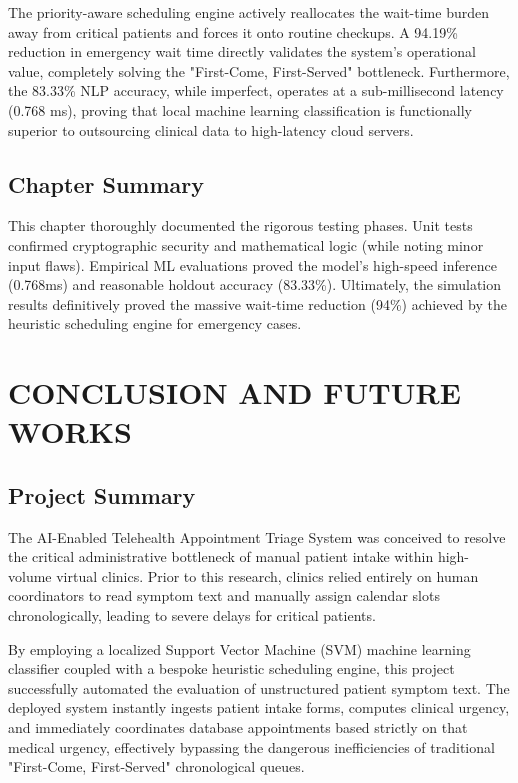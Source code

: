 \documentclass[12pt,a4paper]{report}
\begin{document}
The priority-aware scheduling engine actively reallocates the wait-time burden away from critical patients and forces it onto routine checkups. A 94.19\% reduction in emergency wait time directly validates the system's operational value, completely solving the "First-Come, First-Served" bottleneck. Furthermore, the 83.33\% NLP accuracy, while imperfect, operates at a sub-millisecond latency (0.768 ms), proving that local machine learning classification is functionally superior to outsourcing clinical data to high-latency cloud servers.

\section{Chapter Summary}
This chapter thoroughly documented the rigorous testing phases. Unit tests confirmed cryptographic security and mathematical logic (while noting minor input flaws). Empirical ML evaluations proved the model's high-speed inference (0.768ms) and reasonable holdout accuracy (83.33\%). Ultimately, the simulation results definitively proved the massive wait-time reduction (94\%) achieved by the heuristic scheduling engine for emergency cases.

\chapter{CONCLUSION AND FUTURE WORKS}

\section{Project Summary}
The AI-Enabled Telehealth Appointment Triage System was conceived to resolve the critical administrative bottleneck of manual patient intake within high-volume virtual clinics. Prior to this research, clinics relied entirely on human coordinators to read symptom text and manually assign calendar slots chronologically, leading to severe delays for critical patients.

By employing a localized Support Vector Machine (SVM) machine learning classifier coupled with a bespoke heuristic scheduling engine, this project successfully automated the evaluation of unstructured patient symptom text. The deployed system instantly ingests patient intake forms, computes clinical urgency, and immediately coordinates database appointments based strictly on that medical urgency, effectively bypassing the dangerous inefficiencies of traditional "First-Come, First-Served" chronological queues.
\end{document}
